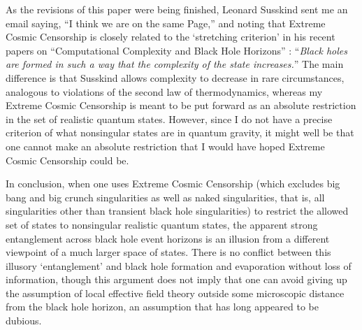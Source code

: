 \documentclass[12pt]{article}
\begin{document}
As the revisions of this paper were being finished, Leonard Susskind sent me an email saying, ``I think we are on the same Page,'' and noting that Extreme Cosmic Censorship is closely related to the `stretching criterion' in his recent papers on ``Computational Complexity and Black Hole Horizons'' \cite{Susskind:2014rva,Susskind:2014ira}:  ``{\it Black holes are formed in such a way that the complexity of the state increases.}''  The main difference is that Susskind allows complexity to decrease in rare circumstances, analogous to violations of the second law of thermodynamics, whereas my Extreme Cosmic Censorship is meant to be put forward as an absolute restriction in the set of realistic quantum states.  However, since I do not have a precise criterion of what nonsingular states are in quantum gravity, it might well be that one cannot make an absolute restriction that I would have hoped Extreme Cosmic Censorship could be.

In conclusion, when one uses Extreme Cosmic Censorship (which excludes big bang and big crunch singularities as well as naked singularities, that is, all singularities other than transient black hole singularities) to restrict the allowed set of states to nonsingular realistic quantum states, the apparent strong entanglement across black hole event horizons is an illusion from a different viewpoint of a much larger space of states.  There is no conflict between this illusory `entanglement' and black hole formation and evaporation without loss of information, though this argument does not imply that one can avoid giving up the assumption of local effective field theory outside some microscopic distance from the black hole horizon, an assumption that has long appeared to be dubious.
\end{document}
